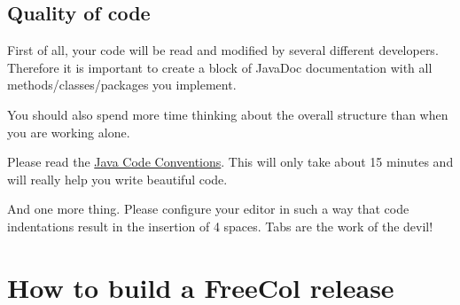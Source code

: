 \documentclass[12pt]{book}
\begin{document}
\hypertarget{Quality of code}{\section{Quality of code}}

First of all, your code will be read and modified by several
different developers. Therefore it is important to create a
block of JavaDoc documentation with all methods/classes/packages
you implement.

You should also spend more time thinking about the overall
structure than when you are working alone.

Please read the \href{http://java.sun.com/docs/codeconv/}{Java Code
  Conventions}. This will only take about 15 minutes and will really
help you write beautiful code.

And one more thing. Please configure your editor in such a way
that code indentations result in the insertion of 4 spaces. Tabs
are the work of the devil!




\hypertarget{How to build a FreeCol release}{\chapter{How to build a FreeCol release}}
\end{document}
